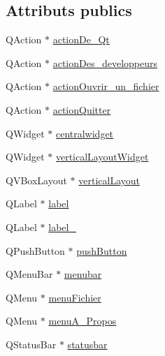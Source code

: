 \subsection*{Attributs publics}
\begin{DoxyCompactItemize}
\item 
Q\+Action $\ast$ \hyperlink{classUi__MainWindowLaunchDialog_ad330b743b240886eec788d726229510c}{action\+De\+\_\+\+Qt}
\item 
Q\+Action $\ast$ \hyperlink{classUi__MainWindowLaunchDialog_ad35fac29b9df90655a3afcfda6f593d7}{action\+Des\+\_\+developpeurs}
\item 
Q\+Action $\ast$ \hyperlink{classUi__MainWindowLaunchDialog_a1f2289cb780a2b574328bb9eeb72d2ae}{action\+Ouvrir\+\_\+un\+\_\+fichier}
\item 
Q\+Action $\ast$ \hyperlink{classUi__MainWindowLaunchDialog_a79e4a5fecf0b677f688db0d27fd85883}{action\+Quitter}
\item 
Q\+Widget $\ast$ \hyperlink{classUi__MainWindowLaunchDialog_aa830f03176134817a5d0f829f80b98c7}{centralwidget}
\item 
Q\+Widget $\ast$ \hyperlink{classUi__MainWindowLaunchDialog_a18052818965cf103bed3e6dbbf72fac8}{vertical\+Layout\+Widget}
\item 
Q\+V\+Box\+Layout $\ast$ \hyperlink{classUi__MainWindowLaunchDialog_a249a932d8ac5a63462b4e5ee0084b959}{vertical\+Layout}
\item 
Q\+Label $\ast$ \hyperlink{classUi__MainWindowLaunchDialog_a74a25c82a489e8e5b2c02230e66702cf}{label}
\item 
Q\+Label $\ast$ \hyperlink{classUi__MainWindowLaunchDialog_a5365f56fbc86828b5ffe9354c0155d88}{label\+\_}
\item 
Q\+Push\+Button $\ast$ \hyperlink{classUi__MainWindowLaunchDialog_a1f7427c8637b108ce3dd4e5c237ed91c}{push\+Button}
\item 
Q\+Menu\+Bar $\ast$ \hyperlink{classUi__MainWindowLaunchDialog_abe91ed6036fff89837665caa8d52881e}{menubar}
\item 
Q\+Menu $\ast$ \hyperlink{classUi__MainWindowLaunchDialog_ac84cdb6c1fd07e050bcd9f27c6fa7487}{menu\+Fichier}
\item 
Q\+Menu $\ast$ \hyperlink{classUi__MainWindowLaunchDialog_a07a3daedceb3e705eeaef8fb62fe0c38}{menu\+A\+\_\+\+Propos}
\item 
Q\+Status\+Bar $\ast$ \hyperlink{classUi__MainWindowLaunchDialog_ae5d4599a0e0a01dccb6ec5212639d73d}{statusbar}
\end{DoxyCompactItemize}


